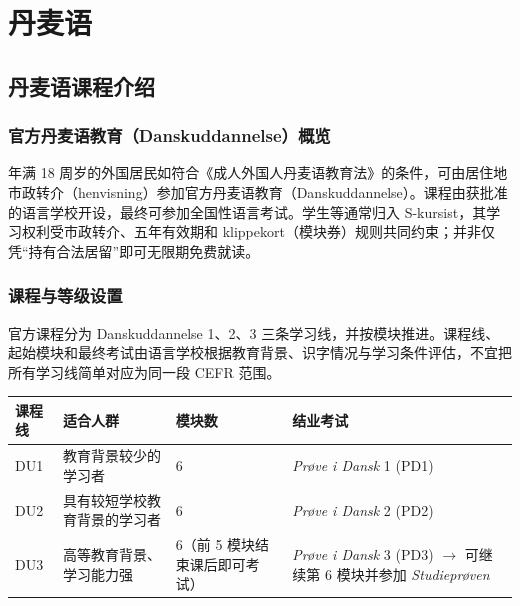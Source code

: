 \section{丹麦语}

\subsection{丹麦语课程介绍} \label{sec:danish}

\subsubsection{官方丹麦语教育（Danskuddannelse）概览}
年满 18 周岁的外国居民如符合《成人外国人丹麦语教育法》的条件，可由居住地市政转介（henvisning）参加官方丹麦语教育（Danskuddannelse）。课程由获批准的语言学校开设，最终可参加全国性语言考试。学生等通常归入 S-kursist，其学习权利受市政转介、五年有效期和 klippekort（模块券）规则共同约束；并非仅凭“持有合法居留”即可无限期免费就读。

\subsubsection{课程与等级设置}
官方课程分为 Danskuddannelse 1、2、3 三条学习线，并按模块推进。课程线、起始模块和最终考试由语言学校根据教育背景、识字情况与学习条件评估，不宜把所有学习线简单对应为同一段 CEFR 范围。


\begin{table}[htbp]
    \scriptsize
    \centering
    \label{tab:danish_course_levels}
    \renewcommand{\arraystretch}{1.2}
    \setlength{\tabcolsep}{6pt}
    \begin{tabularx}{\textwidth}{l X l X}
        \toprule
        \textbf{课程线} & \textbf{适合人群} & \textbf{模块数} & \textbf{结业考试} \\
        \midrule
        DU1 & 教育背景较少的学习者 & 6 & \textit{Prøve i Dansk} 1 (PD1) \\
        DU2 & 具有较短学校教育背景的学习者 & 6 & \textit{Prøve i Dansk} 2 (PD2) \\
        DU3 & 高等教育背景、学习能力强 & 6（前 5 模块结束课后即可考试） & \textit{Prøve i Dansk} 3 (PD3) $\rightarrow$ 可继续第 6 模块并参加 \textit{Studieprøven} \\
        \bottomrule
    \end{tabularx}
\end{table}

